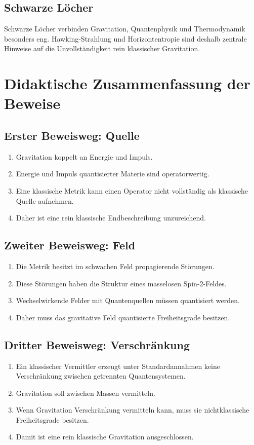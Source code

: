 \documentclass[11pt,a4paper,oneside]{book}
\theoremstyle{definition}
\theoremstyle{plain}
\theoremstyle{remark}
\begin{document}
\section{Schwarze Löcher}
Schwarze Löcher verbinden Gravitation, Quantenphysik und Thermodynamik besonders eng. Hawking-Strahlung und Horizontentropie sind deshalb zentrale Hinweise auf die Unvollständigkeit rein klassischer Gravitation.

\chapter{Didaktische Zusammenfassung der Beweise}
\section{Erster Beweisweg: Quelle}
\begin{enumerate}[label=\arabic*.]
\item Gravitation koppelt an Energie und Impuls.
\item Energie und Impuls quantisierter Materie sind operatorwertig.
\item Eine klassische Metrik kann einen Operator nicht vollständig als klassische Quelle aufnehmen.
\item Daher ist eine rein klassische Endbeschreibung unzureichend.
\end{enumerate}

\section{Zweiter Beweisweg: Feld}
\begin{enumerate}[label=\arabic*.]
\item Die Metrik besitzt im schwachen Feld propagierende Störungen.
\item Diese Störungen haben die Struktur eines masselosen Spin-2-Feldes.
\item Wechselwirkende Felder mit Quantenquellen müssen quantisiert werden.
\item Daher muss das gravitative Feld quantisierte Freiheitsgrade besitzen.
\end{enumerate}

\section{Dritter Beweisweg: Verschränkung}
\begin{enumerate}[label=\arabic*.]
\item Ein klassischer Vermittler erzeugt unter Standardannahmen keine Verschränkung zwischen getrennten Quantensystemen.
\item Gravitation soll zwischen Massen vermitteln.
\item Wenn Gravitation Verschränkung vermitteln kann, muss sie nichtklassische Freiheitsgrade besitzen.
\item Damit ist eine rein klassische Gravitation ausgeschlossen.
\end{enumerate}
\end{document}
